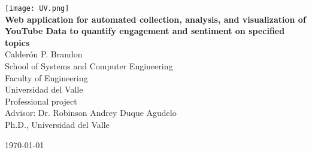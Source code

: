 \begin{titlepage}

	\centering
	\texttt{[image: UV.png]}  \\[1cm]
	{\LARGE\bfseries Web application for automated collection, analysis, and visualization of YouTube Data to quantify engagement and sentiment on specified topics} \\[3cm]

	{\large Calderón P. Brandon} \\[0.5cm]

	{\large School of Systems and Computer Engineering} \\[0.3cm]
	{\large Faculty of Engineering} \\[0.3cm]
	{\large Universidad del Valle} \\[2cm]

	{\large Professional project} \\[0.5cm]

	{\large Advisor: Dr. Robinson Andrey Duque Agudelo} \\[0.3cm]
	{\normalsize Ph.D., Universidad del Valle} \\[2cm]

	\vfill

	{\today}
\end{titlepage}
